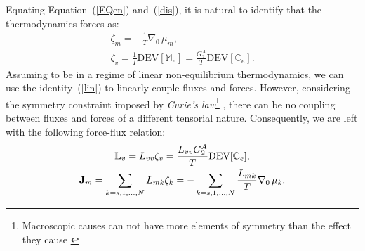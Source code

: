 Equating Equation~(\ref{EQen}) and~(\ref{dis}), it is natural to identify that the thermodynamics forces as:
\begin{gather}
\zeta_m = -\frac{1}{T} \nabla_0 \,\mu_m, \label{vflow1}\\
\zeta_v = \frac{1}{T} \text{DEV}[\mathbb{M}_e] = \frac{G^A_2}{T} \text{DEV}[\mathbb{C}_e].
\end{gather}
Assuming to be in a regime of linear non-equilibrium thermodynamics, we can use the identity~(\ref{lin}) to linearly couple fluxes and forces. However, considering the symmetry constraint imposed by \textit{Curie's law}\footnote{Macroscopic causes can not have more elements of symmetry than the effect they cause \cite{CIT}} , there can be no coupling between fluxes and forces of a different tensorial nature. Consequently, we are left with the following force-flux relation:
\begin{gather}
\mathbb{L}_v = L_{vv} \zeta_v=\frac{L_{vv} G^A_2}{T} \text{DEV}[\mathbb{C}_e],\label{vflow2}\\
\mathbf{J}_m = \sum_{k=s,1,\ldots,N} L_{mk}\zeta_k= -\sum_{k=s,1,\ldots,N} \frac{L_{mk}}{T} \nabla_0 \,\mu_k. \label{dif}
\end{gather}


